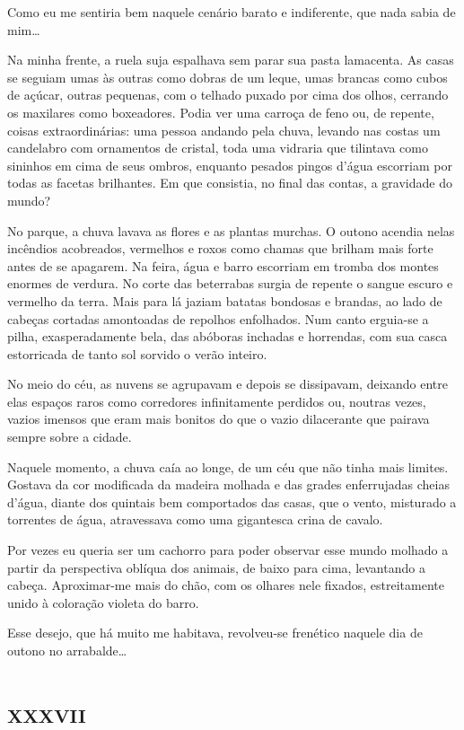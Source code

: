 Como eu me sentiria bem naquele cenário barato e indiferente, que nada sabia de mim\ldots{}

Na minha frente, a ruela suja espalhava sem parar sua pasta lamacenta. As casas se seguiam umas às outras como dobras de um leque, umas brancas como cubos de açúcar, outras pequenas, com o telhado puxado por cima dos olhos, cerrando os maxilares como boxeadores. Podia ver uma carroça de feno ou, de repente, coisas extraordinárias: uma pessoa andando pela chuva, levando nas costas um candelabro com ornamentos de cristal, toda uma vidraria que tilintava como sininhos em cima de seus ombros, enquanto pesados pingos d'água escorriam por todas as facetas brilhantes. Em que consistia, no final das contas, a gravidade do mundo?

No parque, a chuva lavava as flores e as plantas murchas. O outono acendia nelas incêndios acobreados, vermelhos e roxos como chamas que brilham mais forte antes de se apagarem. Na feira, água e barro escorriam em tromba dos montes enormes de verdura. No corte das beterrabas surgia de repente o sangue escuro e vermelho da terra. Mais para lá jaziam batatas bondosas e brandas, ao lado de cabeças cortadas amontoadas de repolhos enfolhados. Num canto erguia-se a pilha, exasperadamente bela, das abóboras inchadas e horrendas, com sua casca estorricada de tanto sol sorvido o verão inteiro.

No meio do céu, as nuvens se agrupavam e depois se dissipavam, deixando entre elas espaços raros como corredores infinitamente perdidos ou, noutras vezes, vazios imensos que eram mais bonitos do que o vazio dilacerante que pairava sempre sobre a cidade.

Naquele momento, a chuva caía ao longe, de um céu que não tinha mais limites. Gostava da cor modificada da madeira molhada e das grades enferrujadas cheias d'água, diante dos quintais bem comportados das casas, que o vento, misturado a torrentes de água, atravessava como uma gigantesca crina de cavalo.

Por vezes eu queria ser um cachorro para poder observar esse mundo molhado a partir da perspectiva oblíqua dos animais, de baixo para cima, levantando a cabeça. Aproximar-me mais do chão, com os olhares nele fixados, estreitamente unido à coloração violeta do barro.

Esse desejo, que há muito me habitava, revolveu-se frenético naquele dia de outono no arrabalde\ldots{}


\chapter*{\huge\centering\textsc{xxxvii}}

